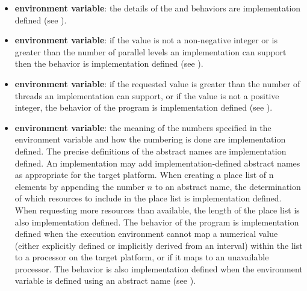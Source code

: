 \begin{itemize}
\item {} \textbf{environment variable}: the details of the  and 
 behaviors are implementation defined (see ).

\item {} \textbf{environment variable}: if the value is not a 
non-negative integer or is greater than the number of parallel levels an implementation 
can support then the behavior is implementation defined (see ).

\item {} \textbf{environment variable}: if the requested value is greater than 
the number of threads an implementation can support, or if the value is not a positive 
integer, the behavior of the program is implementation defined (see ).

\item {} \textbf{environment variable}: the meaning of the numbers specified in the 
environment variable and how the numbering is done are implementation defined. 
The precise definitions of the abstract names are implementation defined. An
implementation may add implementation-defined abstract names as appropriate for 
the target platform. When creating a place list of n elements by appending the 
number $n$ to an abstract name, the determination of which resources to include in the 
place list is implementation defined. When requesting more resources than available, 
the length of the place list is also implementation defined. The behavior of the 
program is implementation defined when the execution environment cannot map a 
numerical value (either explicitly defined or implicitly derived from an interval) 
within the  list to a processor on the target platform, or if it maps to an 
unavailable processor. The behavior is also implementation defined when the 
 environment variable is defined using an abstract name (see ).

\end{itemize}



